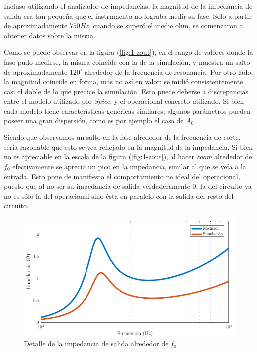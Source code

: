 \documentclass[../../tc_tp3_main.tex]{subfiles}
\begin{document}
Incluso utilizando el analizador de impedancias, la magnitud de la impedancia de salida era tan peque\~na que el instrumento no lograba medir su fase. S\'olo a partir de aproximadamente $750Hz$, cuando se super\'o el medio ohm, se comenzaron a obtener datos sobre la misma. \par

Como se puede observar en la figura (\ref{fig:1-zout}), en el rango de valores donde la fase pudo medirse, la misma coincide con la de la simulaci\'on, y muestra un salto de aproximadamente $120^\circ$ alrededor de la frecuencia de resonancia. Por otro lado, la magnitud coincide en forma, mas no as\'i en valor: se midi\'o consistentemente casi el doble de lo que predice la simulaci\'on. Esto puede deberse a discrepancias entre el modelo utilizado por \textit{Spice}, y el operacional concreto utilizado. Si bien cada modelo tiene caracter\'isticas gen\'ericas similares, algunos par\'ametros pueden poseer una gran dispersi\'on, como es por ejemplo el caso de $A_0$. \par 

Siendo que observamos un salto en la fase alrededor de la frecuencia de corte, ser\'ia razonable que esto se vea reflejado en la magnitud de la impedancia. Si bien no es apreciable en la escala de la figura (\ref{fig:1-zout}), al hacer \textit{zoom} alrededor de $f_0$ efectivamente se aprecia un pico en la impedancia, similar al que se ve\'ia a la entrada. Esto pone de manifiesto el comportamiento no ideal del operacional, puesto que al no ser su impedancia de salida verdaderamente 0, la del circuito ya no es s\'olo la del operacional sino \'esta en paralelo con la salida del resto del circuito. 

\begin{figure}[H]
	\centering
  	\includegraphics[scale = 0.6]{imagenes/tc_tp3_ej1_zout_zoom.png}
  	\caption{Detalle de la impedancia de salida alrededor de $f_0$}
  	\label{fig:1-zout-zoom1}
\end{figure}
\end{document}
